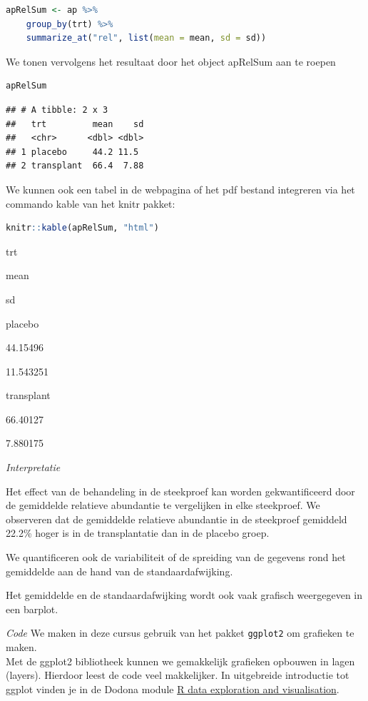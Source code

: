 \documentclass[
  12pt,dutch,coursenotes]{book}
\newcommand{\passthrough}[1]{#1}
\begin{document}
\begin{lstlisting}[language=R]
apRelSum <- ap %>%
    group_by(trt) %>%
    summarize_at("rel", list(mean = mean, sd = sd))
\end{lstlisting}

We tonen vervolgens het resultaat door het object apRelSum aan te roepen

\begin{lstlisting}[language=R]
apRelSum
\end{lstlisting}

\begin{lstlisting}
## # A tibble: 2 x 3
##   trt         mean    sd
##   <chr>      <dbl> <dbl>
## 1 placebo     44.2 11.5 
## 2 transplant  66.4  7.88
\end{lstlisting}

We kunnen ook een tabel in de webpagina of het pdf bestand integreren via het commando kable van het knitr pakket:

\begin{lstlisting}[language=R]
knitr::kable(apRelSum, "html")
\end{lstlisting}

trt

mean

sd

placebo

44.15496

11.543251

transplant

66.40127

7.880175

\emph{Interpretatie}

Het effect van de behandeling in de steekproef kan worden gekwantificeerd door de gemiddelde relatieve abundantie te vergelijken in elke steekproef. We observeren dat de gemiddelde relatieve abundantie in de steekproef gemiddeld 22.2\% hoger is in de transplantatie dan in de placebo groep.

We quantificeren ook de variabiliteit of de spreiding van de gegevens rond het gemiddelde aan de hand van de standaardafwijking.

Het gemiddelde en de standaardafwijking wordt ook vaak grafisch weergegeven in een barplot.

\emph{Code}
We maken in deze cursus gebruik van het pakket \passthrough{\lstinline!ggplot2!} om grafieken te maken.\\
Met de ggplot2 bibliotheek kunnen we gemakkelijk grafieken opbouwen in lagen (layers).
Hierdoor leest de code veel makkelijker.
In uitgebreide introductie tot ggplot vinden je in de Dodona module \href{https://dodona.ugent.be/nl/courses/345/}{R data exploration and visualisation}.
\end{document}
